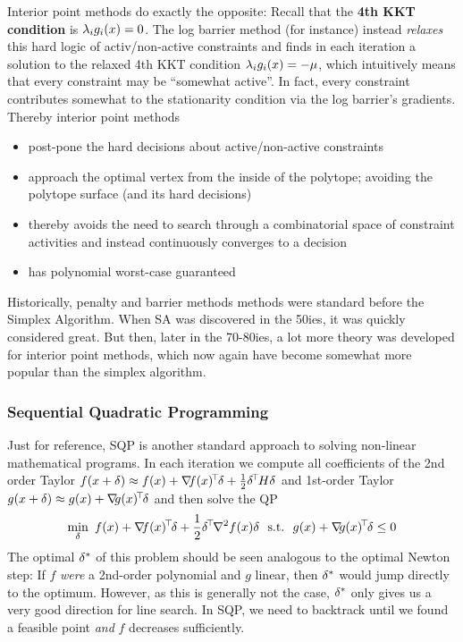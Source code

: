Interior point methods do exactly the opposite: Recall that
the \textbf{4th KKT condition} is $\lambda_i g_i(x) = 0$. The log barrier
method (for instance) instead \emph{relaxes} this hard logic of
activ/non-active constraints and finds in each iteration a solution to
the relaxed 4th KKT condition $\lambda_i g_i(x) = -\mu$, which intuitively
means that every constraint may be ``somewhat active''. In fact, every
constraint contributes somewhat to the stationarity condition via the
log barrier's gradients. Thereby interior point methods
\begin{itemize}
\item  post-pone the hard decisions about active/non-active
constraints
\item approach the optimal vertex from the inside of the polytope;
avoiding the polytope surface (and its hard decisions)
\item thereby avoids the need to search through a combinatorial space
of constraint activities and instead continuously converges to a
decision
\item has polynomial worst-case guaranteed
\end{itemize}

Historically, penalty and barrier methods methods were standard before
the Simplex Algorithm. When SA was discovered in the 50ies, it was
quickly considered great. But then, later in the 70-80ies, a lot more
theory was developed for interior point methods, which now again have
become somewhat more popular than the simplex algorithm.


\subsubsection{Sequential Quadratic Programming}

Just for reference, SQP is another standard approach to solving
non-linear mathematical programs. In each iteration we compute all
coefficients of the 2nd order Taylor
$f(x+\delta) \approx f(x) + {\nabla_{\!\!}} f(x)^{\!\top\!}\delta + \frac{1}{2} \delta^{\!\top\!} H \delta$
and 1st-order Taylor
$g(x+\delta) \approx g(x) + {\nabla_{\!\!}} g(x)^{\!\top\!}\delta$ and then solve the QP
\begin{equation}
\min_\d~ f(x) + \na f(x)^\T \d + \half \d^\T \he f(x) \d \st g(x) + \na
g(x)^\T \d\le 0
\end{equation}
The optimal $\delta^*$ of this problem should be seen
analogous to the optimal Newton step: If
$f$ \emph{were} a 2nd-order polynomial and $g$ linear, then $\delta^*$
would jump directly to the optimum. However, as this is generally not
the case, $\delta^*$ only gives us a very good direction for line
search. In SQP, we need to backtrack until we found a feasible
point \emph{and} $f$ decreases sufficiently.

